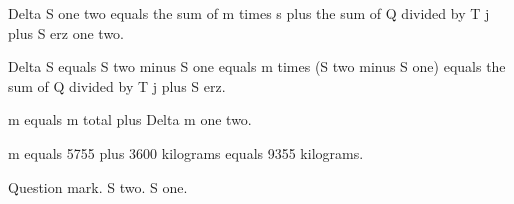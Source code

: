 Delta S one two equals the sum of m times s plus the sum of Q divided by T j plus S erz one two.  

Delta S equals S two minus S one equals m times (S two minus S one) equals the sum of Q divided by T j plus S erz.  

m equals m total plus Delta m one two.  

m equals 5755 plus 3600 kilograms equals 9355 kilograms.  

Question mark.  
S two.  
S one.